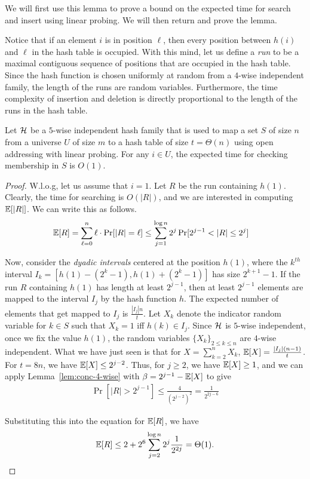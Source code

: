 We will first use this lemma to prove a bound on the expected time for search
and insert using linear probing. We will then return and prove the lemma.

Notice that if an element $i$ is in position $\ell$, then every position between
$h(i)$ and $\ell$ in the hash table is occupied. With this mind, let us define a
\emph{run} to be a maximal contiguous sequence of positions that are occupied in
the hash table. Since the hash function is chosen uniformly at random from a
$4$-wise independent family, the length of the runs are random
variables. Furthermore, the time complexity of insertion and deletion is
directly proportional to the length of the runs in the hash table.

\begin{lemma}
  Let ${\cal H}$ be a $5$-wise independent hash family that is used to map a set
  $S$ of size $n$ from a universe $U$ of size $m$ to a hash table of size
  $t = \Theta(n)$ using open addressing with linear probing. For any $i\in U$,
  the expected time for checking membership in $S$ is $O(1)$.
  \label{lem:linear-probe-run}
\end{lemma}
\begin{proof}
W.l.o.g, let us assume that $i=1$. Let $R$ be the run containing
$h(1)$. Clearly, the time for searching is $O(|R|)$, and we are
interested in computing $\mathbb{E}[|R|]$. We can write this as follows.
\begin{align*}
  \mathbb{E}[R] &= \sum_{\ell = 0}^n \ell \cdot \Pr[|R| = \ell] \leq \sum_{j=1}^{\log n} 2^{j} \Pr[ 2^{j-1} < |R| \leq 2^j]
\end{align*}

Now, consider the \emph{dyadic intervals} centered at the position $h(1)$, where
the $k^{th}$ interval $I_k = [h(1) - (2^k - 1), h(1) + (2^k - 1)]$ has size
$2^{k+1}-1$. If the run $R$ containing $h(1)$ has length at least $2^{j-1}$,
then at least $2^{j-1}$ elements are mapped to the interval $I_j$ by the hash
function $h$. The expected number of elements that get mapped to $I_j$ is
$\frac{|I_j|n}{t}$. Let $X_k$ denote the indicator random variable for $k\in S$
such that $X_k=1$ iff $h(k) \in I_j$. Since ${\cal H}$ is $5$-wise independent,
once we fix the value $h(1)$, the random variables $\{X_k\}_{2\leq k\leq n}$ are
$4$-wise independent. What we have just seen is that for $X = \sum_{k=2}^n X_k$,
$\mathbb{E}[X] = \frac{|I_j|(n-1)}{t}$. For $t = 8n$, we have $\mathbb{E}[X] \leq 2^{j-2}$. Thus,
for $j \geq 2$, we have $\mathbb{E}[X] \geq 1$, and we can apply
Lemma~\ref{lem:conc-4-wise} with $\beta = 2^{j-1}-\mathbb{E}[X]$ to give
\begin{align*}
  \Pr[|R| > 2^{j-1}] \leq \frac{4}{\left(2^{j-2} \right)^2} = \frac{1}{2^{2j-6}}
\end{align*}

Substituting  this into the equation for $\mathbb{E}[R]$, we have
\begin{align*}
  \mathbb{E}[R] \leq 2 + 2^6 \sum_{j=2}^{\log n} 2^j \frac{1}{2^{2j}} = \Theta(1).
\end{align*}  
\end{proof}

